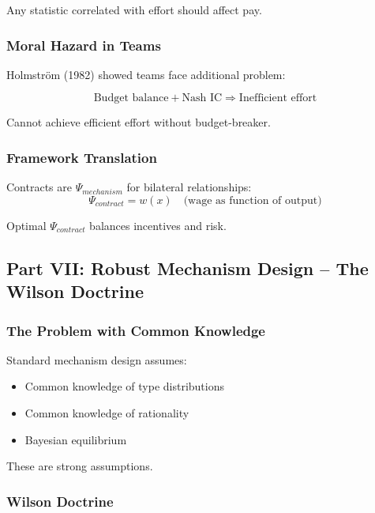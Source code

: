 Any statistic correlated with effort should affect pay.

\subsubsection{Moral Hazard in Teams}

Holmström (1982) showed teams face additional problem:

\begin{equation}
\text{Budget balance} + \text{Nash IC} \Rightarrow \text{Inefficient effort}
\end{equation}

Cannot achieve efficient effort without budget-breaker.

\subsubsection{Framework Translation}

Contracts are $\Psi_{mechanism}$ for bilateral relationships:
\begin{equation}
\Psi_{contract} = w(x) \quad \text{(wage as function of output)}
\end{equation}

Optimal $\Psi_{contract}$ balances incentives and risk.

\subsection{Part VII: Robust Mechanism Design – The Wilson Doctrine}

\subsubsection{The Problem with Common Knowledge}

Standard mechanism design assumes:
\begin{itemize}
    \item Common knowledge of type distributions
    \item Common knowledge of rationality
    \item Bayesian equilibrium
\end{itemize}

These are strong assumptions.

\subsubsection{Wilson Doctrine}

